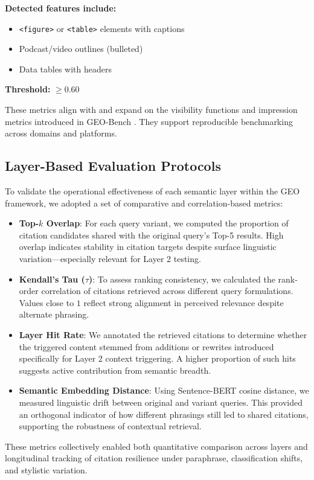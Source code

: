 \textbf{Detected features include:}
\begin{itemize}
  \item \texttt{<figure>} or \texttt{<table>} elements with captions
  \item Podcast/video outlines (bulleted)
  \item Data tables with headers
\end{itemize}

\textbf{Threshold:} $\geq 0.60$

These metrics align with and expand on the visibility functions and impression metrics introduced in GEO-Bench \cite{aggarwal2024geo}. They support reproducible benchmarking across domains and platforms.

\subsection{Layer-Based Evaluation Protocols}

To validate the operational effectiveness of each semantic layer within the GEO framework, we adopted a set of comparative and correlation-based metrics:

\begin{itemize}
  \item \textbf{Top-$k$ Overlap}: For each query variant, we computed the proportion of citation candidates shared with the original query’s Top-5 results. High overlap indicates stability in citation targets despite surface linguistic variation—especially relevant for Layer 2 testing.
  
  \item \textbf{Kendall’s Tau ($\tau$)}: To assess ranking consistency, we calculated the rank-order correlation of citations retrieved across different query formulations. Values close to $1$ reflect strong alignment in perceived relevance despite alternate phrasing.
  
  \item \textbf{Layer Hit Rate}: We annotated the retrieved citations to determine whether the triggered content stemmed from additions or rewrites introduced specifically for Layer 2 context triggering. A higher proportion of such hits suggests active contribution from semantic breadth.
  
  \item \textbf{Semantic Embedding Distance}: Using Sentence-BERT cosine distance, we measured linguistic drift between original and variant queries. This provided an orthogonal indicator of how different phrasings still led to shared citations, supporting the robustness of contextual retrieval.
\end{itemize}

These metrics collectively enabled both quantitative comparison across layers and longitudinal tracking of citation resilience under paraphrase, classification shifts, and stylistic variation.

